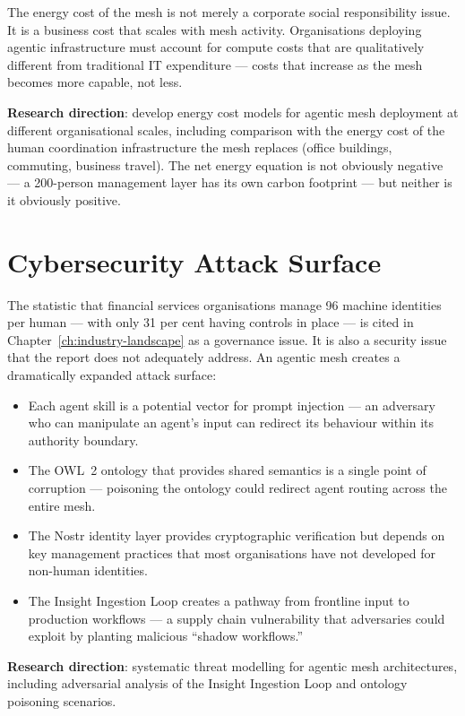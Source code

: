The energy cost of the mesh is not merely a corporate social responsibility issue. It is a business cost that scales with mesh activity. Organisations deploying agentic infrastructure must account for compute costs that are qualitatively different from traditional IT expenditure --- costs that increase as the mesh becomes more capable, not less.

\textbf{Research direction}: develop energy cost models for agentic mesh deployment at different organisational scales, including comparison with the energy cost of the human coordination infrastructure the mesh replaces (office buildings, commuting, business travel). The net energy equation is not obviously negative --- a 200-person management layer has its own carbon footprint --- but neither is it obviously positive.

\section{Cybersecurity Attack Surface}

The statistic that financial services organisations manage 96 machine identities per human \parencite{CyberArk2025} --- with only 31 per cent having controls in place --- is cited in Chapter~\ref{ch:industry-landscape} as a governance issue. It is also a security issue that the report does not adequately address. An agentic mesh creates a dramatically expanded attack surface:

\begin{itemize}
  \item Each agent skill is a potential vector for prompt injection --- an adversary who can manipulate an agent's input can redirect its behaviour within its authority boundary.
  \item The OWL~2 ontology that provides shared semantics is a single point of corruption --- poisoning the ontology could redirect agent routing across the entire mesh.
  \item The Nostr identity layer provides cryptographic verification but depends on key management practices that most organisations have not developed for non-human identities.
  \item The Insight Ingestion Loop creates a pathway from frontline input to production workflows --- a supply chain vulnerability that adversaries could exploit by planting malicious ``shadow workflows.''
\end{itemize}

\textbf{Research direction}: systematic threat modelling for agentic mesh architectures, including adversarial analysis of the Insight Ingestion Loop and ontology poisoning scenarios.

